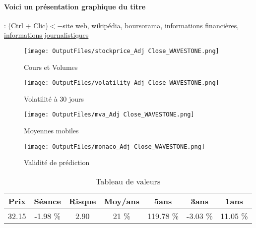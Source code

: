 \documentclass[11pt,a4paper]{report}%
\begin{document}
\paragraph{Voici un présentation graphique du titre} : (Ctrl + Clic)$<-$\href{https://www.wavestone.com/fr/}{site web}, \href{https://fr.wikipedia.org/wiki/Wavestone}{wikipédia}, \href{https://www.boursorama.com/cours/1rPWAVE}{boursorama}, \href{https://www.qwant.com/?q=site:https:%2f%2fwww.easybourse.com%2faction-societe%2fWAVESTONE&t=web&client=ext-firefox-hp}{informations financières}, \href{https://bourse.lerevenu.com/cours-de-bourse/fiche-valeur-synthese/WAVESTONE/WAVE-FR}{informations journalistiques}
\begin{figure}[!htb]
   \begin{minipage}{0.5\textwidth}
     \centering
     \texttt{[image: OutputFiles/stockprice\_Adj Close\_WAVESTONE.png]}
     \caption{Cours et Volumes}\label{Fig:price_WAVESTONE}
   \end{minipage}\hfill
   \begin{minipage}{0.5\textwidth}
     \centering
     \texttt{[image: OutputFiles/volatility\_Adj Close\_WAVESTONE.png]}
     \caption{Volatilité à 30 jours}\label{Fig:volat_WAVESTONE}
   \end{minipage}
\end{figure}
\begin{figure}[!htb]
   \begin{minipage}{0.5\textwidth}
     \centering
     \texttt{[image: OutputFiles/mva\_Adj Close\_WAVESTONE.png]}
     \caption{Moyennes mobiles}\label{Fig:mva_WAVESTONE}
   \end{minipage}\hfill
   \begin{minipage}{0.5\textwidth}
     \centering
     \texttt{[image: OutputFiles/monaco\_Adj Close\_WAVESTONE.png]}
     \caption{Validité de prédiction}\label{Fig:prediction_WAVESTONE}
   \end{minipage}
\end{figure}

\begin{table}[H]
  \centering
    \begin{tabular}{|c|c|c|c|c|c|c|}
    \hline
    Prix & Séance & Risque  & Moy/ans & 5ans & 3ans & 1ans \\
    \hline
    32.15 &    -1.98 \%    & 2.90 & 21 \% & 119.78 \% & -3.03 \% & 11.05 \% \\
    \hline
    \end{tabular}%
        \label{tab:table_WAVESTONE}%
      \caption{Tableau de valeurs}
\end{table}%
\end{document}
